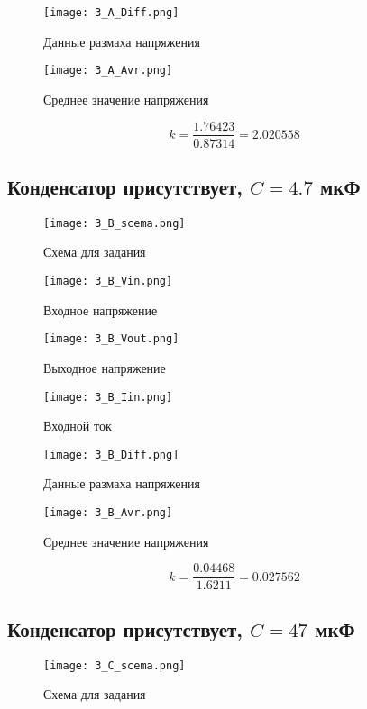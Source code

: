 \documentclass[a4paper,14pt]{article}
\begin{document}
\begin{figure}[H]
	\centering
	\texttt{[image: 3\_A\_Diff.png]}
	\caption{Данные размаха напряжения}	
\end{figure}

\begin{figure}[H]
	\centering
	\texttt{[image: 3\_A\_Avr.png]}
	\caption{Среднее значение напряжения}	
\end{figure}

$$k = \frac{1.76423}{0.87314} = 2.020558$$

\subsection{Конденсатор присутствует, $C = 4.7$ мкФ}
\begin{figure}[H]
	\centering
	\texttt{[image: 3\_B\_scema.png]}
	\caption{Схема для задания}	
\end{figure}

\begin{figure}[H]
	\centering
	\texttt{[image: 3\_B\_Vin.png]}
	\caption{Входное напряжение}	
\end{figure}

\begin{figure}[H]
	\centering
	\texttt{[image: 3\_B\_Vout.png]}
	\caption{Выходное напряжение}	
\end{figure}

\begin{figure}[H]
	\centering
	\texttt{[image: 3\_B\_Iin.png]}
	\caption{Входной ток}	
\end{figure}

\begin{figure}[H]
	\centering
	\texttt{[image: 3\_B\_Diff.png]}
	\caption{Данные размаха напряжения}	
\end{figure}

\begin{figure}[H]
	\centering
	\texttt{[image: 3\_B\_Avr.png]}
	\caption{Среднее значение напряжения}	
\end{figure}

$$k = \frac{0.04468}{1.6211} = 0.027562$$

\subsection{Конденсатор присутствует, $C = 47$ мкФ}
\begin{figure}[H]
	\centering
	\texttt{[image: 3\_C\_scema.png]}
	\caption{Схема для задания}	
\end{figure}
\end{document}
